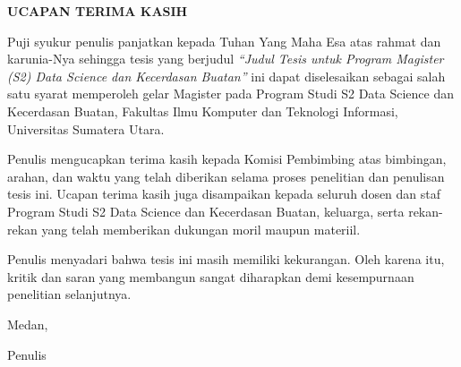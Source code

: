 \thispagestyle{empty}
\begin{center}
{\bfseries UCAPAN TERIMA KASIH\par}
\vspace{10mm}
\end{center}

\noindent Puji syukur penulis panjatkan kepada Tuhan Yang Maha Esa atas rahmat dan karunia-Nya sehingga tesis yang berjudul \textit{``Judul Tesis untuk Program Magister (S2) Data Science dan Kecerdasan Buatan''} ini dapat diselesaikan sebagai salah satu syarat memperoleh gelar Magister pada Program Studi S2 Data Science dan Kecerdasan Buatan, Fakultas Ilmu Komputer dan Teknologi Informasi, Universitas Sumatera Utara.

Penulis mengucapkan terima kasih kepada Komisi Pembimbing atas bimbingan, arahan, dan waktu yang telah diberikan selama proses penelitian dan penulisan tesis ini. Ucapan terima kasih juga disampaikan kepada seluruh dosen dan staf Program Studi S2 Data Science dan Kecerdasan Buatan, keluarga, serta rekan-rekan yang telah memberikan dukungan moril maupun materiil.

Penulis menyadari bahwa tesis ini masih memiliki kekurangan. Oleh karena itu, kritik dan saran yang membangun sangat diharapkan demi kesempurnaan penelitian selanjutnya.

\vspace{10mm}
\noindent Medan, \the\year

\vspace{6mm}
\noindent Penulis
\clearpage
